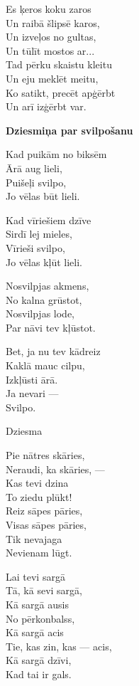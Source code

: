 \documentclass[14pt]{extarticle}
\begin{document}
Es ķeros koku zaros\\
Un raibā šlipsē karos,\\
Un izveļos no gultas,\\
Un tūlīt mostos ar...\\
Tad pērku skaistu kleitu\\
Un eju meklēt meitu,\\
Ko satikt, precēt apģērbt\\
Un arī izģērbt var.


\newpage

{\bf Dziesmiņa par svilpošanu}

Kad puikām no biksēm\\
Ārā aug lieli,\\
Puišeļi svilpo,\\
Jo vēlas būt lieli.

Kad vīriešiem dzīve\\
Sirdī lej mieles,\\
Vīrieši svilpo,\\
Jo vēlas kļūt lieli.

Nosvilpjas akmens,\\
No kalna grūstot,\\
Nosvilpjas lode,\\
Par nāvi tev kļūstot.

Bet, ja nu tev kādreiz\\
Kaklā mauc cilpu,\\
Izkļūsti ārā.\\
Ja nevari ---\\
Svilpo.


\newpage

{\large \sc Dziesma}

Pie nātres skāries,\\
Neraudi, ka skāries, ---\\
Kas tevi dzina\\
To ziedu plūkt!\\
Reiz sāpes pāries,\\
Visas sāpes pāries,\\
Tik nevajaga\\
Nevienam lūgt.

Lai tevi sargā\\
Tā, kā sevi sargā,\\
Kā sargā ausis\\
No pērkonbalss,\\
Kā sargā acis\\
Tie, kas zin, kas --- acis,\\
Kā sargā dzīvi,\\
Kad tai ir gals.
\end{document}

